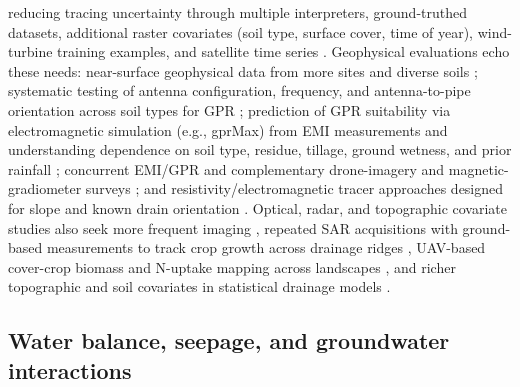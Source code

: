 \documentclass[11pt]{article}
\begin{document}
reducing tracing uncertainty through multiple interpreters, ground-truthed
datasets, additional raster covariates (soil type, surface cover, time of year),
wind-turbine training examples, and satellite time series \parencite{Redoloza2023}.
Geophysical evaluations echo these needs: near-surface geophysical data from more
sites and diverse soils \parencite{Allred2005}; systematic testing of antenna
configuration, frequency, and antenna-to-pipe orientation across soil types for
GPR \parencite{Allred2013}; prediction of GPR suitability via electromagnetic
simulation (e.g., gprMax) from EMI measurements and understanding dependence on
soil type, residue, tillage, ground wetness, and prior rainfall
\parencite{Koganti2020,Koganti2021}; concurrent EMI/GPR and complementary
drone-imagery and magnetic-gradiometer surveys \parencite{Koganti2020}; and
resistivity/electromagnetic tracer approaches designed for slope and known drain
orientation \parencite{Jouen2018}. Optical, radar, and topographic covariate
studies also seek more frequent imaging \parencite{Tlapáková2017}, repeated SAR
acquisitions with ground-based measurements to track crop growth across drainage
ridges \parencite{Meunier2001}, UAV-based cover-crop biomass and N-uptake mapping
across landscapes \parencite{Xu2018}, and richer topographic and soil covariates
in statistical drainage models \parencite{Harris2018}.

\subsection{Water balance, seepage, and groundwater interactions}
\end{document}
